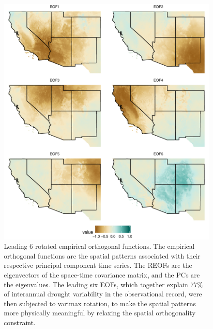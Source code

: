 \documentclass[11pt]{wlscirep}
\begin{document}
\begin{figure}[!htbp]
\centering
\includegraphics[width=.8\linewidth]{figures/reof_observed.pdf}
\caption{Leading 6 rotated empirical orthogonal functions. The empirical orthogonal functions are the spatial patterns associated with their respective principal component time series. The REOFs are the eigenvectors of the space-time covariance matrix, and the PCs are the eigenvalues. The leading six EOFs, which together explain 77\% of interannual drought variability in the observational record, were then subjected to varimax rotation, to make the spatial patterns more physically meaningful by relaxing the spatial orthogonality constraint.}
\label{fig:reofs}
\end{figure}
\end{document}
